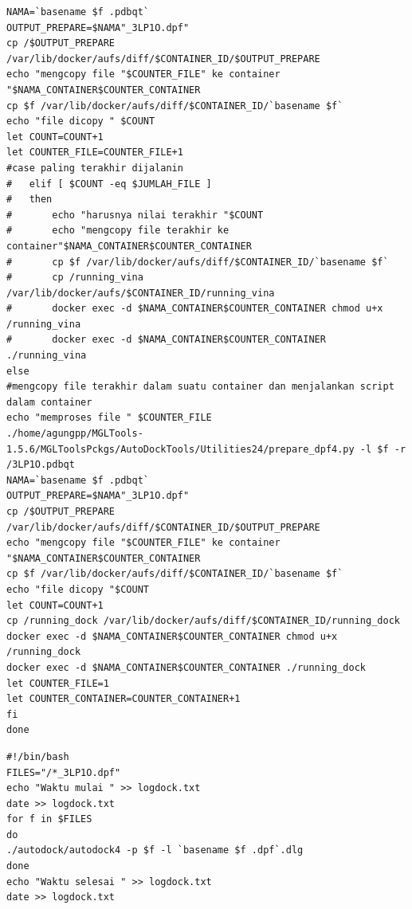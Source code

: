 \begin{lstlisting}[caption=\textit{Script} yang digunakan pada \textit{desktop} PC untuk membuat container dan menjalankan container]
NAMA=`basename $f .pdbqt`
OUTPUT_PREPARE=$NAMA"_3LP1O.dpf"
cp /$OUTPUT_PREPARE /var/lib/docker/aufs/diff/$CONTAINER_ID/$OUTPUT_PREPARE
echo "mengcopy file "$COUNTER_FILE" ke container "$NAMA_CONTAINER$COUNTER_CONTAINER
cp $f /var/lib/docker/aufs/diff/$CONTAINER_ID/`basename $f`
echo "file dicopy " $COUNT
let COUNT=COUNT+1
let COUNTER_FILE=COUNTER_FILE+1
#case paling terakhir dijalanin
#	elif [ $COUNT -eq $JUMLAH_FILE ]
#	then 
#		echo "harusnya nilai terakhir "$COUNT
#		echo "mengcopy file terakhir ke container"$NAMA_CONTAINER$COUNTER_CONTAINER
#		cp $f /var/lib/docker/aufs/diff/$CONTAINER_ID/`basename $f`
#		cp /running_vina /var/lib/docker/aufs/$CONTAINER_ID/running_vina
#		docker exec -d $NAMA_CONTAINER$COUNTER_CONTAINER chmod u+x /running_vina
#		docker exec -d $NAMA_CONTAINER$COUNTER_CONTAINER ./running_vina
else
#mengcopy file terakhir dalam suatu container dan menjalankan script dalam container
echo "memproses file " $COUNTER_FILE
./home/agungpp/MGLTools-1.5.6/MGLToolsPckgs/AutoDockTools/Utilities24/prepare_dpf4.py -l $f -r /3LP1O.pdbqt
NAMA=`basename $f .pdbqt`
OUTPUT_PREPARE=$NAMA"_3LP1O.dpf"
cp /$OUTPUT_PREPARE /var/lib/docker/aufs/diff/$CONTAINER_ID/$OUTPUT_PREPARE
echo "mengcopy file "$COUNTER_FILE" ke container "$NAMA_CONTAINER$COUNTER_CONTAINER
cp $f /var/lib/docker/aufs/diff/$CONTAINER_ID/`basename $f`
echo "file dicopy "$COUNT
let COUNT=COUNT+1
cp /running_dock /var/lib/docker/aufs/diff/$CONTAINER_ID/running_dock
docker exec -d $NAMA_CONTAINER$COUNTER_CONTAINER chmod u+x /running_dock
docker exec -d $NAMA_CONTAINER$COUNTER_CONTAINER ./running_dock
let COUNTER_FILE=1
let COUNTER_CONTAINER=COUNTER_CONTAINER+1
fi
done

\end{lstlisting}

\begin{lstlisting}[caption=\textit{Script} yang dijalankan pada masing - masing container]
#!/bin/bash
FILES="/*_3LP1O.dpf"
echo "Waktu mulai " >> logdock.txt
date >> logdock.txt
for f in $FILES
do
./autodock/autodock4 -p $f -l `basename $f .dpf`.dlg
done
echo "Waktu selesai " >> logdock.txt
date >> logdock.txt

\end{lstlisting}


